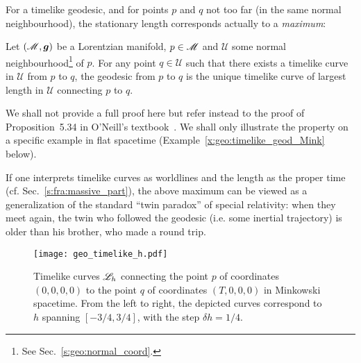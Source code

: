 For a timelike geodesic, and for points $p$ and $q$ not too far (in the same
normal neighbourhood),
the stationary length corresponds actually to a \emph{maximum}:
\begin{greybox}
Let $(\mathscr{M},\bm{g})$ be a Lorentzian manifold, $p\in\mathscr{M}$ and $\mathscr{U}$ some
normal neighbourhood\footnote{See Sec.~\ref{s:geo:normal_coord}.} of $p$. For any point $q\in\mathscr{U}$
such that there exists a timelike curve in $\mathscr{U}$ from $p$ to $q$,
the geodesic from $p$ to $q$ is the unique timelike curve of largest length
in $\mathscr{U}$ connecting $p$ to $q$.
\end{greybox}
We shall not provide a full proof here but refer instead to
the proof of Proposition~5.34 in O'Neill's textbook~\cite{ONeil83}.
We shall only illustrate the property on a specific example in flat spacetime
(Example~\ref{x:geo:timelike_geod_Mink} below).

If one interprets timelike curves as worldlines and the length as the proper time
(cf. Sec.~\ref{s:fra:massive_part}), the above maximum
can be viewed as a generalization of the standard ``twin paradox''
of special relativity: when they meet again, the twin who followed the geodesic (i.e. some
inertial trajectory)
is older than his brother, who made a round trip.

\begin{figure}
\centerline{\texttt{[image: geo\_timelike\_h.pdf]}}
\caption[]{\label{f:geo:timelike_h} \footnotesize
Timelike curves $\mathscr{L}_h$ connecting the point $p$
of coordinates $(0,0,0,0)$ to the point $q$ of coordinates $(T,0,0,0)$
in Minkowski spacetime. From the left to right, the depicted curves
correspond to $h$ spanning $[-3/4, 3/4]$, with the step $\delta h = 1/4$.}
\end{figure}


